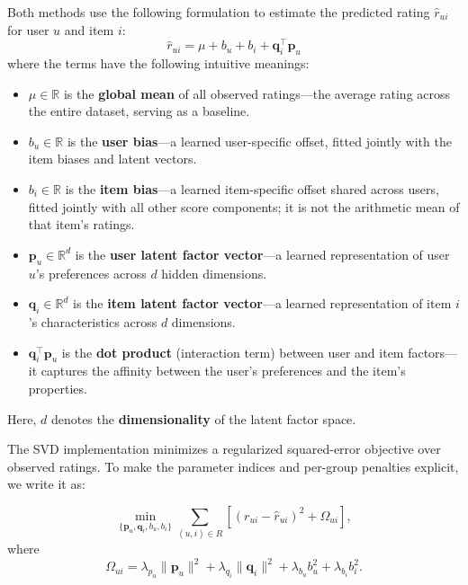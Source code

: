 \documentclass[information,article,submit,pdftex,moreauthors]{Definitions/mdpi}
\begin{document}
Both methods use the following formulation to estimate the predicted rating $\hat{r}_{ui}$ for user $u$ and item $i$:
\begin{equation}
  \hat{r}_{ui} = \mu + b_u + b_i + \mathbf{q}_i^\top \mathbf{p}_u
  \label{eq:prediction}
\end{equation}
where the terms have the following intuitive meanings:
\begin{itemize}
  \item $\mu \in \mathbb{R}$ is the \textbf{global mean} of all observed ratings—the average rating across the entire dataset, serving as a baseline.
  \item $b_u \in \mathbb{R}$ is the \textbf{user bias}—a learned user-specific offset, fitted jointly with the item biases and latent vectors.
  \item $b_i \in \mathbb{R}$ is the \textbf{item bias}—a learned item-specific offset shared across users, fitted jointly with all other score components; it is not the arithmetic mean of that item's ratings.
  \item $\mathbf{p}_u \in \mathbb{R}^d$ is the \textbf{user latent factor vector}—a learned representation of user $u$'s preferences across $d$ hidden dimensions.
  \item $\mathbf{q}_i \in \mathbb{R}^d$ is the \textbf{item latent factor vector}—a learned representation of item $i$'s characteristics across $d$ dimensions.
  \item $\mathbf{q}_i^\top \mathbf{p}_u$ is the \textbf{dot product} (interaction term) between user and item factors—it captures the affinity between the user's preferences and the item's properties.
\end{itemize}

Here, $d$ denotes the \textbf{dimensionality} of the latent factor space.

The SVD implementation minimizes a regularized squared-error objective over observed ratings. To make the parameter indices and per-group penalties explicit, we write it as:

\begin{equation}
\label{eq:svd_objective}
\min_{\{\mathbf{p}_u,\mathbf{q}_i,b_u,b_i\}}
\sum_{(u,i)\in R}
\left[(r_{ui}-\hat r_{ui})^2+\Omega_{ui}\right],
\end{equation}
where
\begin{equation}
\Omega_{ui}=\lambda_{p_u}\|\mathbf{p}_u\|^2+
\lambda_{q_i}\|\mathbf{q}_i\|^2+
\lambda_{b_u}b_u^2+\lambda_{b_i}b_i^2.
\end{equation}
\end{document}
